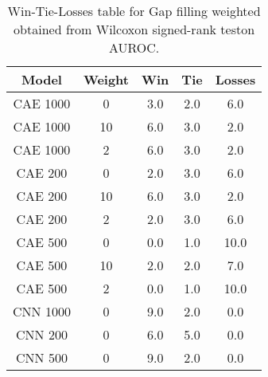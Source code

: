 \begin{table}[H]
\centering
\begin{tabular}{|c|c|c|c|c|}

\textbf{Model} & \textbf{Weight} &  \textbf{Win} &  \textbf{Tie} &  \textbf{Losses} \\
\hline

      CAE 1000 &               0 &           3.0 &           2.0 &              6.0 \\
\hline
      CAE 1000 &              10 &           6.0 &           3.0 &              2.0 \\
\hline
      CAE 1000 &               2 &           6.0 &           3.0 &              2.0 \\
\hline
       CAE 200 &               0 &           2.0 &           3.0 &              6.0 \\
\hline
       CAE 200 &              10 &           6.0 &           3.0 &              2.0 \\
\hline
       CAE 200 &               2 &           2.0 &           3.0 &              6.0 \\
\hline
       CAE 500 &               0 &           0.0 &           1.0 &             10.0 \\
\hline
       CAE 500 &              10 &           2.0 &           2.0 &              7.0 \\
\hline
       CAE 500 &               2 &           0.0 &           1.0 &             10.0 \\
\hline
      CNN 1000 &               0 &           9.0 &           2.0 &              0.0 \\
\hline
       CNN 200 &               0 &           6.0 &           5.0 &              0.0 \\
\hline
       CNN 500 &               0 &           9.0 &           2.0 &              0.0 \\
\hline

\end{tabular}
\caption{Win-Tie-Losses table for Gap filling weighted obtained from Wilcoxon signed-rank teston AUROC.}
\label{tab:gap_filling_weighted_weighted_comparison_all}
\end{table}
